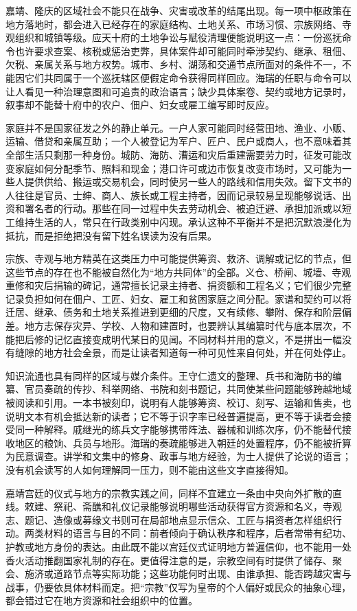 嘉靖、隆庆的区域社会不能只在战争、灾害或改革的结尾出现。每一项中枢政策在地方落地时，都会进入已经存在的家庭结构、土地关系、市场习惯、宗族网络、寺观组织和城镇等级。应天十府的土地争讼与赋役清理便能说明这一点：一份巡抚命令也许要求查案、核税或惩治吏弊，具体案件却可能同时牵涉契约、继承、租佃、欠税、亲属关系与地方权势。城市、乡村、湖荡和交通节点所面对的条件不一，不能因它们共同属于一个巡抚辖区便假定命令获得同样回应。海瑞的任职与命令可以让人看见一种治理意图和可追责的政治语言；缺少具体案卷、契约或地方记录时，叙事却不能替十府中的农户、佃户、妇女或雇工编写即时反应。

家庭并不是国家征发之外的静止单元。一户人家可能同时经营田地、渔业、小贩、运输、借贷和亲属互助；一个人被登记为军户、匠户、民户或商人，也不意味着其全部生活只剩那一种身份。城防、海防、漕运和灾后重建需要劳力时，征发可能改变家庭如何分配季节、照料和现金；港口许可或边市恢复改变市场时，又可能为一些人提供供给、搬运或交易机会，同时使另一些人的路线和信用失效。留下文书的人往往是官员、士绅、商人、族长或工程主持者，因而记录较易呈现能够说话、出资和署名者的行动。那些在同一过程中失去劳动机会、被迫迁避、承担加派或以短工维持生活的人，常只在行政类别中闪现。承认这种不平衡并不是把沉默浪漫化为抵抗，而是拒绝把没有留下姓名误读为没有后果。

宗族、寺观与地方精英在这类压力中可能提供筹资、救济、调解或记忆的节点，但这些节点的存在也不能被自然化为“地方共同体”的全部。义仓、桥闸、城墙、寺观重修和灾后捐输的碑记，通常擅长记录主持者、捐资额和工程名义；它们很少完整记录负担如何在佃户、工匠、妇女、雇工和贫困家庭之间分配。家谱和契约可以将迁居、继承、债务和土地关系推进到更细的尺度，又有续修、攀附、保存和阶层偏差。地方志保存灾异、学校、人物和建置时，也要辨认其编纂时代与底本层次，不能把后修的记忆直接变成明代某日的见闻。不同材料并用的意义，不是拼出一幅没有缝隙的地方社会全景，而是让读者知道每一种可见性来自何处，并在何处停止。

知识流通也具有同样的区域与媒介条件。王守仁遗文的整理、兵书和海防书的编纂、官员奏疏的传抄、科举网络、书院和刻书题记，共同使某些问题能够跨越地域被阅读和引用。一本书被刻印，说明有人能够筹资、校订、刻写、运输和售卖，也说明文本有机会抵达新的读者；它不等于识字率已经普遍提高，更不等于读者会接受同一种解释。戚继光的练兵文字能够携带阵法、器械和训练次序，仍不能替代接收地区的粮饷、兵员与地形。海瑞的奏疏能够进入朝廷的处置程序，仍不能被折算为民意调查。讲学和文集中的修身、政事与地方经验，为士人提供了论说的语言；没有机会读写的人如何理解同一压力，则不能由这些文字直接得知。

嘉靖宫廷的仪式与地方的宗教实践之间，同样不宜建立一条由中央向外扩散的直线。敕建、祭祀、斋醮和礼仪记录能够说明哪些活动获得官方资源和名义，寺观志、题记、造像或募缘文书则可在局部地点显示信众、工匠与捐资者怎样组织行动。两类材料的语言与目的不同：前者倾向于确认秩序和程序，后者常带有纪功、护教或地方身份的表达。由此既不能以宫廷仪式证明地方普遍信仰，也不能用一处香火活动推翻国家礼制的存在。更值得注意的是，宗教空间有时提供了储存、聚会、施济或道路节点等实际功能；这些功能何时出现、由谁承担、能否跨越灾害与战事，仍要依具体材料而定。把“宗教”仅写为皇帝的个人偏好或民众的抽象心理，都会错过它在地方资源和社会组织中的位置。

